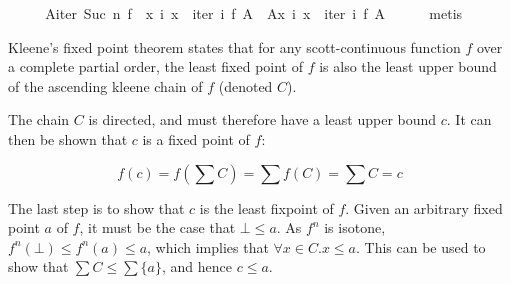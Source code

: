 \begin{isabellebody}
\ \ \isamarkupfalse%
\ \isamarkupfalse%
\ {}{}\isactrlbsub Aiter\ {}Suc\ n{}\ f\ {}\ {}x{}\ {}i{}\ x\ {}\ iter\ i\ f\ {}\isactrlbsub A\ {}\ {}\isactrlbsub Ax{}\ {}i{}\ x\ {}\ iter\ i\ f\ {}\isactrlbsub A\isanewline
\ \ \ \ \isamarkupfalse%
\ metis\isanewline
{}\isamarkupfalse%
%
\endisatagproof
{\isafoldproof}%
%
\isadelimproof
%
\endisadelimproof
%
\isamarkuptrue%
%
\begin{isamarkuptext}%
Kleene's fixed point theorem states that for any
  scott-continuous function $f$ over a complete partial order, the
  least fixed point of $f$ is also the least upper bound of the
  ascending kleene chain of $f$ (denoted $C$).

  The chain $C$ is directed, and must therefore have a least upper
  bound $c$. It can then be shown that $c$ is a fixed point of $f$:

  \[
  f(c) = f\left(\sum C\right) = \sum f(C) = \sum C = c
  \]

  The last step is to show that $c$ is the least fixpoint of
  $f$. Given an arbitrary fixed point $a$ of $f$, it must be the case
  that $\bot \le a$. As $f^n$ is isotone, $f^n(\bot) \le f^n(a) \le
  a$, which implies that $\forall x \in C. x \le a$. This can be used
  to show that $\sum C \le \sum\{a\}$, and hence $c \le a$.


\end{isamarkuptext}
\end{isabellebody}
